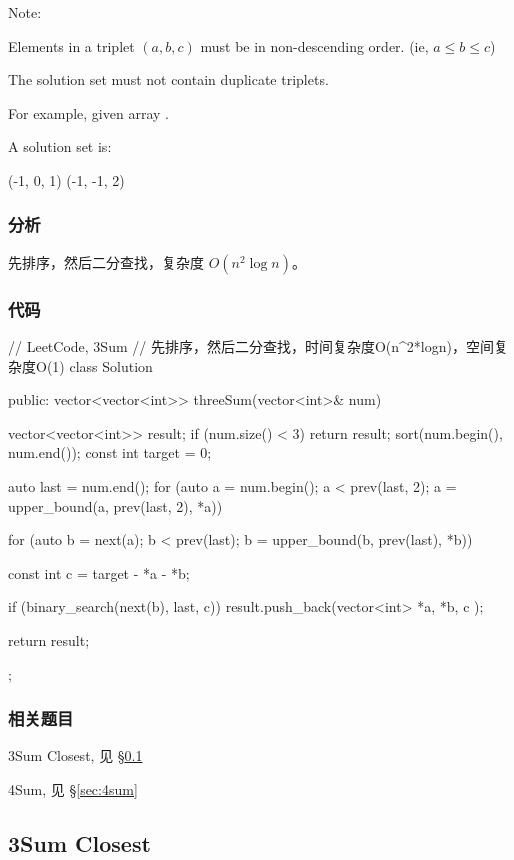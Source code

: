 Note:
\begindot
\item Elements in a triplet $(a,b,c)$ must be in non-descending order. (ie, $a \leq b \leq c$)
\item The solution set must not contain duplicate triplets.
\myenddot

For example, given array .

A solution set is:
\begin{Code}
(-1, 0, 1)
(-1, -1, 2)
\end{Code}


\subsubsection{分析}
先排序，然后二分查找，复杂度 $O(n^2 \log n)$。


\subsubsection{代码}
\begin{Code}
// LeetCode, 3Sum
// 先排序，然后二分查找，时间复杂度O(n^2*logn)，空间复杂度O(1)
class Solution {
public:
    vector<vector<int>> threeSum(vector<int>& num) {
        vector<vector<int>> result;
        if (num.size() < 3) return result;
        sort(num.begin(), num.end());
        const int target = 0;

        auto last = num.end();
        for (auto a = num.begin(); a < prev(last, 2);
                a = upper_bound(a, prev(last, 2), *a)) {
            for (auto b = next(a); b < prev(last);
                    b = upper_bound(b, prev(last), *b)) {
                const int c = target - *a - *b;

                if (binary_search(next(b), last, c))
                    result.push_back(vector<int> { *a, *b, c });
            }
        }

        return result;
    }
};
\end{Code}


\subsubsection{相关题目}
\begindot
\item 3Sum Closest, 见 \S \ref{sec:3sum-closest}
\item 4Sum, 见 \S \ref{sec:4sum}
\myenddot

\subsection{3Sum Closest} %
\label{sec:3sum-closest}


